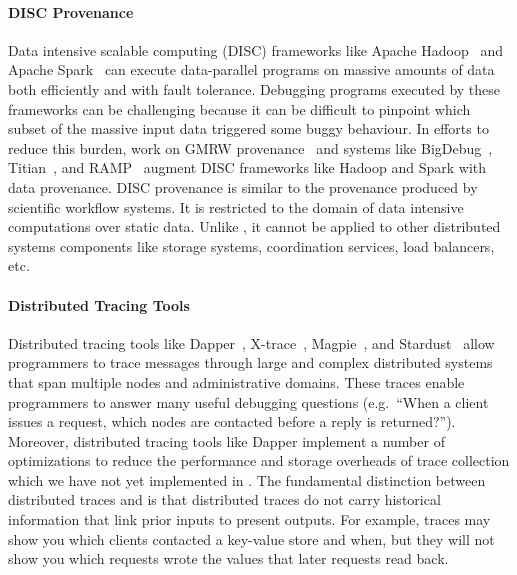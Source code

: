 \paragraph{DISC Provenance}
Data intensive scalable computing (DISC) frameworks like Apache
Hadoop~\cite{shvachko2010hadoop} and Apache Spark~\cite{zaharia2010spark} can
execute data-parallel programs on massive amounts of data both efficiently and
with fault tolerance. Debugging programs executed by these frameworks can be
challenging because it can be difficult to pinpoint which subset of the massive
input data triggered some buggy behaviour. In efforts to reduce this burden,
work on GMRW provenance~\cite{ikeda2011provenance} and systems like
BigDebug~\cite{gulzar2016bigdebug}, Titian~\cite{interlandi2015titian}, and
RAMP~\cite{park2011ramp} augment DISC frameworks like Hadoop and Spark with
data provenance. DISC provenance is similar to the provenance produced by
scientific workflow systems. It is restricted to the domain of data intensive
computations over static data.  Unlike \watprovenance{}, it cannot be applied
to other distributed systems components like storage systems, coordination
services, load balancers, etc.

\paragraph{Distributed Tracing Tools}
Distributed tracing tools like Dapper~\cite{sigelman2010dapper},
X-trace~\cite{fonseca2007x}, Magpie~\cite{barham2003magpie}, and
Stardust~\cite{thereska2006stardust} allow programmers to trace messages
through large and complex distributed systems that span multiple nodes and
administrative domains. These traces enable programmers to answer many useful
debugging questions (e.g.\ ``When a client issues a request, which nodes are
contacted before a reply is returned?''). Moreover, distributed tracing tools
like Dapper implement a number of optimizations to reduce the performance and
storage overheads of trace collection which we have not yet implemented in
\fluent{}.  The fundamental distinction between distributed traces and
\watprovenance{} is that distributed traces do not carry historical information
that link prior inputs to present outputs.  For example, traces may show you
which clients contacted a key-value store and when, but they will not show you
which requests wrote the values that later requests read back.
